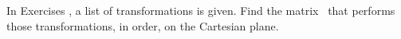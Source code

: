 {\noin In Exercises}
{, a list of transformations is given. Find the matrix \tta\ that performs those transformations, in order, on the Cartesian plane.}
